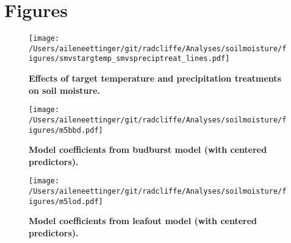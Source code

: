 \documentclass{article}
\begin{document}


\clearpage
\section* {Figures}
\clearpage
 \begin{figure}[h]
\centering
 \texttt{[image: /Users/aileneettinger/git/radcliffe/Analyses/soilmoisture/figures/smvstargtemp\_smvspreciptreat\_lines.pdf]}
 \caption{\textbf{Effects of target temperature and precipitation treatments on soil moisture.}} 
 \label{fig:soilmois}
 \end{figure}

\begin{figure}[h]
\centering
 \texttt{[image: /Users/aileneettinger/git/radcliffe/Analyses/soilmoisture/figures/m5bbd.pdf]}
 \caption{\textbf{Model coefficients from budburst model (with centered predictors).}} 
 \label{fig:bb}
 \end{figure}

\begin{figure}[h]
\centering
 \texttt{[image: /Users/aileneettinger/git/radcliffe/Analyses/soilmoisture/figures/m5lod.pdf]}
 \caption{\textbf{Model coefficients from leafout model (with centered predictors).}} 
 \label{fig:lo}
 \end{figure}


\end{document}
